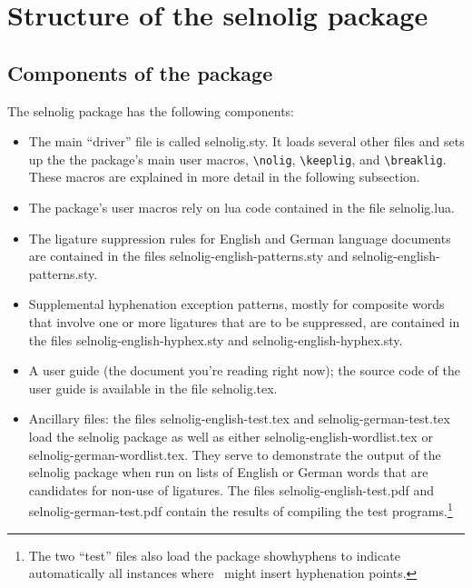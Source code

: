 \documentclass[11pt]{article}
\newcommand{\pkg}[1]{\textsf{#1}}
\newcommand{\cmmd}[1]{\texttt{\textbackslash #1}}
\begin{document}
\section[Structure of the selnolig package]{Structure of the \pkg{selnolig} package}

\subsection{Components of the package}

The \pkg{selnolig} package has the following components:
\begin{itemize}
\item The main \enquote{driver} file is called \pkg{selnolig.sty}. It loads several other files and sets up the the package's main user macros, \cmmd{nolig}, \cmmd{keeplig}, and \cmmd{breaklig}. These macros are explained in more detail in the following subsection.
\item The package's user macros rely on lua code contained in the file \pkg{selnolig.lua}. 
\item The ligature suppression rules for English and German language documents are contained in the files \pkg{selnolig-english-patterns.sty} and \pkg{selnolig-english-patterns.sty}. 
\item Supplemental hyphenation exception patterns, mostly for composite words that involve one or more ligatures that are to be suppressed, are contained in the files \pkg{selnolig-english-hyphex.sty} and \pkg{selnolig-english-hyphex.sty}.
\item A user guide (the document you're reading right now); the source code of the user guide is available in the file \pkg{selnolig.tex}. 

\item Ancillary files: the files \pkg{selnolig-english-test.tex} and \pkg{selnolig-german-test.tex} load the \pkg{selnolig} package as well as either \pkg{selnolig-english-wordlist.tex} or \pkg{selnolig-german-wordlist.tex}. They serve to demonstrate the output of the \pkg{selnolig} package when run on lists of English or German words that are candidates for non-use of ligatures. The files \pkg{selnolig-english-test.pdf} and \pkg{selnolig-german-test.pdf} contain the results of compiling the test programs.\footnote{The two \enquote{test} files also load the package \pkg{showhyphens} to indicate automatically all instances where \LuaLaTeX\ might insert hyphenation points.}

\end{itemize}
\end{document}

